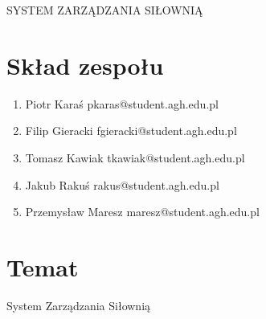 \documentclass[
]{article}
\author{}
\date{}
\providecommand{\tightlist}{%
  \setlength{\itemsep}{0pt}\setlength{\parskip}{0pt}}
\begin{document}
{SYSTEM ZARZĄDZANIA SIŁOWNIĄ}

{}

{}

{}

{}

{}

{}

{}

{}

{}

{}

{}

{}

{}

{}

{}

{}

{}

{}

{}

{}

{}

{}

{}

{}

{}

{}

{}

\hypertarget{h.ysiao1c7cfkz}{%
\section{\texorpdfstring{{Skład
zespołu}}{Skład zespołu}}\label{h.ysiao1c7cfkz}}

\begin{enumerate}
\tightlist
\item
  {Piotr Karaś pkaras@student.agh.edu.pl}
\item
  {Filip Gieracki fgieracki@student.agh.edu.pl}
\item
  {Tomasz Kawiak tkawiak@student.agh.edu.pl}
\item
  {Jakub Rakuś rakus@student.agh.edu.pl}
\item
  {Przemysław Maresz maresz@student.agh.edu.pl}
\end{enumerate}

{}

\hypertarget{h.9f1f1ugzo2hd}{%
\section{\texorpdfstring{{Temat}}{Temat}}\label{h.9f1f1ugzo2hd}}

{System Zarządzania Siłownią}
\end{document}
